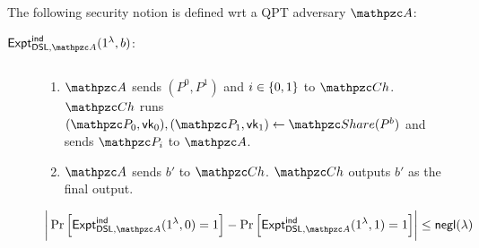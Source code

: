 \begin{definition}[Secrecy]

The following security notion is defined wrt a QPT
adversary $\qA$:

\begin{description}
\item [$\expa{\DSL, \qA}{ind}(1^\secp, b)$:] $ $
\begin{enumerate}
\item $\qA$ sends $(P^0, P^1)$ and $i \in \{0,1\}$
to $\qCh$. $\qCh$ runs $(\qP_0, \vk_0),
(\qP_1, \vk_1) \leftarrow \Sh(P^b)$ and sends $\qP_i$ to $\qA$.
\item
$\qA$ sends $b'$ to $\qCh$. $\qCh$ outputs $b'$ as the final
output.
\end{enumerate}

$$\bigg\lvert \Pr\Big[\expa{\DSL, \qA}{ind}(1^\secp, 0)=1\Big]
-
\Pr\Big[\expa{\DSL, \qA}{ind}(1^\secp, 1)=1\Big]
\bigg\rvert \le \negl(\secp)$$
\end{description}
\end{definition}

\begin{comment}
\begin{definition}[Strong Deletion Security]
TBD. ($\qA_2$ learns nothing more than having black-box access
to $P$).
\end{definition}

\begin{definition}[Secrecy]

The following security notion is defined wrt a QPT adversary $\qA$:

\begin{description}
\item [$\expa{\DSL, \qA}{ind}(1^\secp, \coin)$:] $ $
\begin{enumerate}
\item $\qA$ sends $(P^0, P^1) \in \qC^2$ and $b \in \bit$
to the challenger $\qCh$. $\qCh$ runs $(\qP_0, \vk_0),
(\qP_1, \vk_1) \leftarrow \Sh(P^\coin)$ and sends $\qP_b$ to
$\qA$.
\item $\qA$ sends $\coin'$ to $\qCh$ which is the final output of
the experiment.
\end{enumerate}
\end{description}

A DSL scheme $\DSL$ has secrecy if the following notion holds for
all QPT adversaries $\qA$:

$$\bigg\lvert \Pr\Big[\expa{\DSL, \qA}{ind}(1^\secp, 0)=1\Big]
-
\Pr\Big[\expa{\DSL, \qA}{ind}(1^\secp, 1)=1\Big]
\bigg\rvert \le \negl(\secp)$$

\end{definition}
\end{comment}

